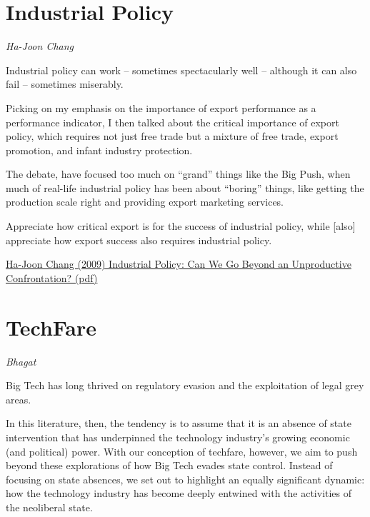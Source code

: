\documentclass[
]{book}
\begin{document}
\hypertarget{industrial-policy}{%
\section{Industrial Policy}\label{industrial-policy}}

\emph{Ha-Joon Chang}

Industrial policy can work -- sometimes spectacularly well -- although it can also fail --
sometimes miserably.

Picking on my emphasis on the importance
of export performance as a performance indicator, I then talked about the critical importance
of export policy, which requires not just free trade but a mixture of free trade, export
promotion, and infant industry protection.

The debate, have focused too much on ``grand'' things like the
Big Push, when much of real-life industrial policy has been about ``boring'' things, like
getting the production scale right and providing export marketing services.

Appreciate how critical
export is for the success of industrial policy, while {[}also{]} appreciate
how export success also requires industrial policy.

\href{pdf/Chang_2009_Industrial_Policy_Confrontation.pdf}{Ha-Joon Chang (2009) Industrial Policy: Can We Go Beyond an Unproductive Confrontation? (pdf)}

\hypertarget{techfare}{%
\section{TechFare}\label{techfare}}

\emph{Bhagat}

Big Tech has long thrived on regulatory evasion and the exploitation of legal grey areas.

In this literature, then, the tendency is to assume that it is an absence of state intervention that has underpinned the technology industry's growing economic (and political) power. With our conception of techfare, however, we aim to push beyond these explorations of how Big Tech evades state control. Instead of focusing on state absences, we set out to highlight an equally significant dynamic: how the technology industry has become deeply entwined with the activities of the neoliberal state.
\end{document}
